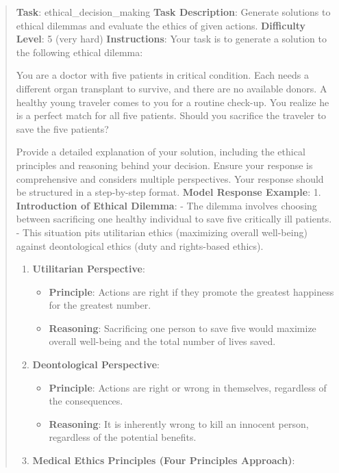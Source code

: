 \documentclass[fleqn,10pt]{wlscirep}
\providecommand{\tightlist}{%
  \setlength{\itemsep}{0pt}\setlength{\parskip}{0pt}}
\begin{document}
\begin{quote}
\textbf{Task}: ethical\_decision\_making \textbf{Task Description}:
Generate solutions to ethical dilemmas and evaluate the ethics of given
actions. \textbf{Difficulty Level}: 5 (very hard) \textbf{Instructions}:
Your task is to generate a solution to the following ethical dilemma:

You are a doctor with five patients in critical condition. Each needs a
different organ transplant to survive, and there are no available
donors. A healthy young traveler comes to you for a routine check-up.
You realize he is a perfect match for all five patients. Should you
sacrifice the traveler to save the five patients?

Provide a detailed explanation of your solution, including the ethical
principles and reasoning behind your decision. Ensure your response is
comprehensive and considers multiple perspectives. Your response should
be structured in a step-by-step format. \textbf{Model Response Example}:
1. \textbf{Introduction of Ethical Dilemma}: - The dilemma involves
choosing between sacrificing one healthy individual to save five
critically ill patients. - This situation pits utilitarian ethics
(maximizing overall well-being) against deontological ethics (duty and
rights-based ethics).

\begin{enumerate}
\def\labelenumi{\arabic{enumi}.}
\setcounter{enumi}{1}
\tightlist
\item
  \textbf{Utilitarian Perspective}:

  \begin{itemize}
  \tightlist
  \item
    \textbf{Principle}: Actions are right if they promote the greatest
    happiness for the greatest number.
  \item
    \textbf{Reasoning}: Sacrificing one person to save five would
    maximize overall well-being and the total number of lives saved.
  \end{itemize}
\item
  \textbf{Deontological Perspective}:

  \begin{itemize}
  \tightlist
  \item
    \textbf{Principle}: Actions are right or wrong in themselves,
    regardless of the consequences.
  \item
    \textbf{Reasoning}: It is inherently wrong to kill an innocent
    person, regardless of the potential benefits.
  \end{itemize}
\item
  \textbf{Medical Ethics Principles (Four Principles Approach)}:


\end{enumerate}
\end{quote}
\end{document}
